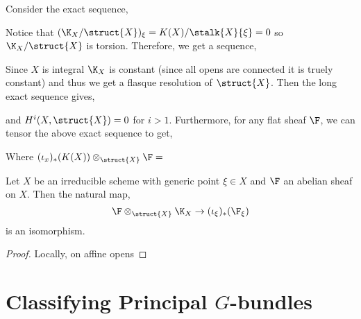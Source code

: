 \documentclass[12pt]{article}
\begin{document}
Consider the exact sequence,
\begin{center}
\end{center}
Notice that $(\K_X / \struct{X})_\xi = K(X) / \stalk{X}{\xi} = 0$ so $\K_X / \struct{X}$ is torsion. Therefore, we get a sequence,
\begin{center}
\end{center}
Since $X$ is integral $\K_X$ is constant (since all opens are connected it is truely constant) and thus we get a flasque resolution of $\struct{X}$. Then the long exact sequence gives,
\begin{center}
\end{center}
and $H^i(X, \struct{X}) = 0$ for $i > 1$. Furthermore, for any flat sheaf $\F$, we can tensor the above exact sequence to get,
\begin{center}
\end{center}
Where $(\iota_x)_*(K(X)) \otimes_{\struct{X}} \F = $ 

\begin{lemma}
Let $X$ be an irreducible scheme with generic point $\xi \in X$ and $\F$ an abelian sheaf on $X$. Then the natural map,
\[ \F \otimes_{\struct{X}} \K_X \to (\iota_\xi)_* (\F_\xi) \]
is an isomorphism.
\end{lemma}

\begin{proof}
Locally, on affine opens 
\end{proof}


\section{Classifying Principal $G$-bundles}
\end{document}
